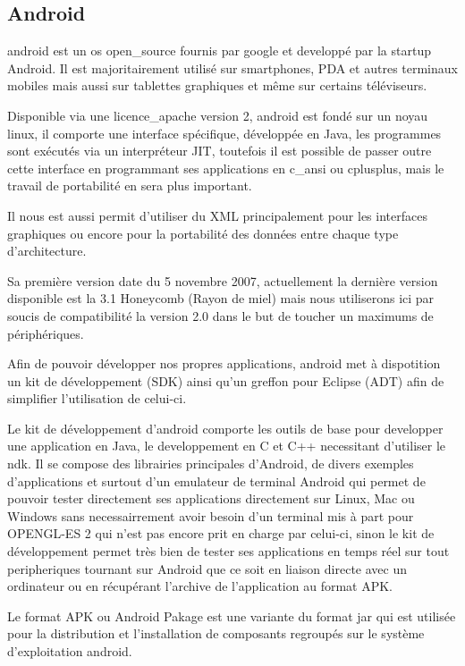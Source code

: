 \subsection{Android}

	\gls{android} est un \gls{os} \gls{open_source} fournis par \gls{google} et
	developpé par la startup Android.
	Il est majoritairement utilisé sur smartphones, PDA et autres terminaux
	mobiles mais aussi sur tablettes graphiques et même sur certains téléviseurs.
	
	Disponible via une \gls{licence_apache} version 2, \gls{android} est fondé  sur
	un noyau \gls{linux}, il comporte une interface spécifique, développée en Java,
	les programmes sont exécutés via un interpréteur JIT, toutefois il est possible
	de passer outre cette interface en programmant ses applications en \gls{c_ansi} ou \gls{cplusplus},
	mais le travail de portabilité en sera plus important.
	
	Il nous est aussi permit d'utiliser du XML principalement pour les interfaces
	graphiques ou encore pour la portabilité des données entre chaque type
	d'architecture.
	
	Sa première version date du 5 novembre 2007, actuellement la dernière version
	disponible est la 3.1 Honeycomb (Rayon de miel) mais nous utiliserons ici par
	soucis de compatibilité la version 2.0 dans le but de toucher un maximums de
	périphériques.
	
	Afin de pouvoir développer nos propres applications, \gls{android} met à
	dispotition un kit de développement (SDK) ainsi qu'un greffon pour Eclipse
	(ADT) afin de simplifier l'utilisation de celui-ci.
	
	Le kit de développement d'\gls{android} comporte les outils de base pour developper une application en
	Java, le developpement en C et C++ necessitant d'utiliser le \gls{ndk}.
	Il se compose des librairies principales d'Android, de divers exemples
	d'applications et surtout d'un emulateur de terminal Android qui permet de
	pouvoir tester directement ses applications directement sur Linux, Mac ou
	Windows sans necessairrement avoir besoin d'un terminal mis à part pour
	OPENGL-ES 2 qui n'est pas encore prit en charge par celui-ci, sinon le kit de développement
	permet très bien de tester ses applications en temps réel sur tout
	peripheriques tournant sur Android que ce soit en liaison directe avec un
	ordinateur ou en récupérant l'archive de l'application au format APK.
	
	Le format APK ou Android Pakage est une variante du format
	\gls{jar} qui est utilisée pour la distribution et l'installation de composants
	regroupés sur le système d'exploitation \gls{android}.


